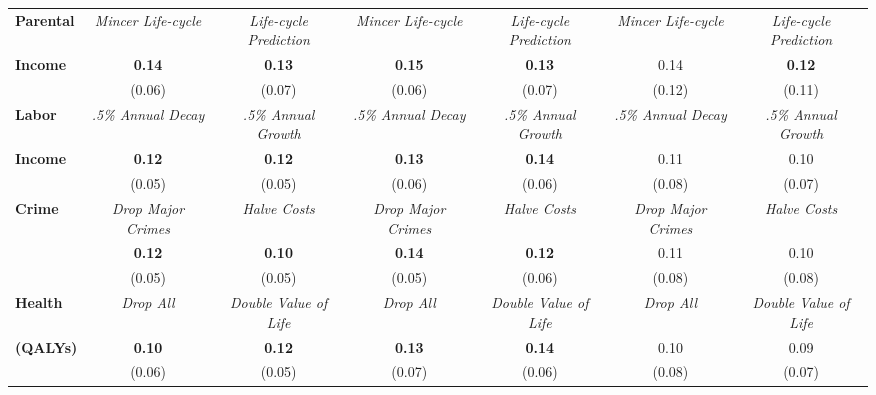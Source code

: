 \begin{tabular}{>{\bfseries}lcc|cc|cc}
Parental	&	\textit{Mincer Life-cycle}	&	\textit{Life-cycle Prediction}	&	\textit{Mincer Life-cycle}	&	\textit{Life-cycle Prediction}	&	\textit{Mincer Life-cycle}	&	\textit{Life-cycle Prediction}	\\
Income	&	\textbf{0.14}	&	\textbf{0.13}	&	\textbf{0.15}	&	\textbf{0.13}	&	0.14	&	\textbf{0.12}	\\
	&	(0.06)	&	(0.07)	&	(0.06)	&	(0.07)	&	(0.12)	&	(0.11)	\\ \midrule
Labor	&	\textit{.5\% Annual Decay}	&	\textit{.5\% Annual Growth}	&	\textit{.5\% Annual Decay}	&	\textit{.5\% Annual Growth}	&	\textit{.5\% Annual Decay}	&	\textit{.5\% Annual Growth}	\\
Income	&	\textbf{0.12}	&	\textbf{0.12}	&	\textbf{0.13}	&	\textbf{0.14}	&	0.11	&	0.10	\\
	&	(0.05)	&	(0.05)	&	(0.06)	&	(0.06)	&	(0.08)	&	(0.07)	\\ \midrule
Crime	&	\textit{Drop Major Crimes}	&	\textit{Halve Costs}	&	\textit{Drop Major Crimes}	&	\textit{Halve Costs}	&	\textit{Drop Major Crimes}	&	\textit{Halve Costs}	\\
	&	\textbf{0.12}	&	\textbf{0.10}	&	\textbf{0.14}	&	\textbf{0.12}	&	0.11	&	0.10	\\
	&	(0.05)	&	(0.05)	&	(0.05)	&	(0.06)	&	(0.08)	&	(0.08)	\\ \midrule
Health	&	\textit{Drop All}	&	\textit{Double Value of Life}	&	\textit{Drop All}	&	\textit{Double Value of Life}	&	\textit{Drop All}	&	\textit{Double Value of Life}	\\
(QALYs)	&	\textbf{0.10}	&	\textbf{0.12}	&	\textbf{0.13}	&	\textbf{0.14}	&	0.10	&	0.09	\\
	&	(0.06)	&	(0.05)	&	(0.07)	&	(0.06)	&	(0.08)	&	(0.07)	\\ \bottomrule
\end{tabular} 
